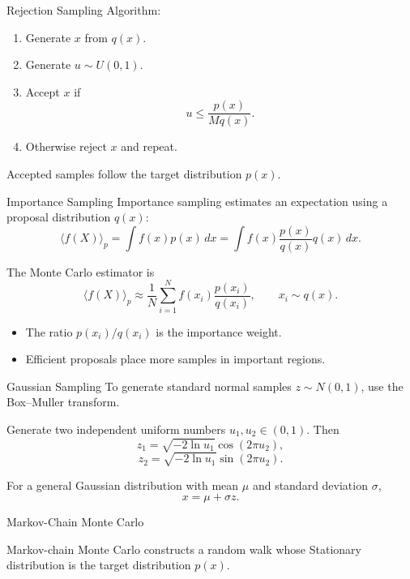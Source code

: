 \documentclass[a4paper, 10pt, onepage]{elegantbook}
\begin{document}
{\begin{frame}{Rejection Sampling}
  Algorithm:
  \begin{enumerate}
    \item Generate \(x\) from \(q(x)\).
    \item Generate \(u\sim U(0,1)\).
    \item Accept \(x\) if
    \[
      u\le\frac{p(x)}{Mq(x)}.
    \]
    \item Otherwise reject \(x\) and repeat.
  \end{enumerate}

  Accepted samples follow the target distribution \(p(x)\).
\end{frame}

\begin{frame}{Importance Sampling}
  Importance sampling estimates an expectation using a proposal distribution \(q(x)\):
  \[
    \langle f(X)\rangle_p
    =
    \int f(x)p(x)\,dx
    =
    \int f(x)\frac{p(x)}{q(x)}q(x)\,dx.
  \]

  The Monte Carlo estimator is
  \[
    \langle f(X)\rangle_p
    \approx
    \frac{1}{N}
    \sum_{i=1}^{N}
    f(x_i)\frac{p(x_i)}{q(x_i)},
    \qquad x_i\sim q(x).
  \]

  \begin{itemize}
    \item The ratio \(p(x_i)/q(x_i)\) is the importance weight.
    \item Efficient proposals place more samples in important regions.
  \end{itemize}
\end{frame}

\begin{frame}{Gaussian Sampling}
  To generate standard normal samples \(z\sim N(0,1)\), use the Box--Muller transform.

  Generate two independent uniform numbers \(u_1,u_2\in(0,1)\). Then
  \[
    z_1=\sqrt{-2\ln u_1}\cos(2\pi u_2),
  \]
  \[
    z_2=\sqrt{-2\ln u_1}\sin(2\pi u_2).
  \]

  For a general Gaussian distribution with mean \(\mu\) and standard deviation \(\sigma\),
  \[
    x=\mu+\sigma z.
  \]
\end{frame}

\begin{frame}{Markov-Chain Monte Carlo}

\medskip

  Markov-chain Monte Carlo constructs a random walk whose Stationary distribution is 
the target distribution \(p(x)\).


\end{frame}}
\end{document}

